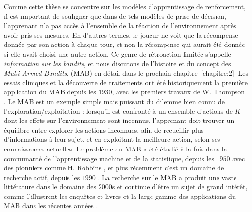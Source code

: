 \begin{resume_fr}
Comme cette thèse se concentre sur les modèles d'apprentissage de renforcement,
il est important de souligner que dans de tels modèles de prise de décision, l'apprenant n'a pas accès à l'ensemble de la réaction de l'environnement après avoir pris ses mesures.
%
En d'autres termes, le joueur ne voit que la récompense donnée par son action à chaque tour, et non la récompense qui aurait été donnée si elle avait choisi une autre action.
Ce genre de rétroaction limitée s'appelle \emph{information sur les bandits}, et nous discutons de l'histoire et du concept des \emph{Multi-Armed Bandits}. (MAB) en détail dans le prochain chapitre~\ref{chapitre:2}.
Les essais cliniques et la découverte de traitements ont été historiquement la première application du MAB depuis les $1930$, avec les premiers travaux de W. Thompson \cite{Thompson33}.
%
Le MAB est un exemple simple mais puissant du dilemme bien connu de l'exploration/exploitation :
lorsqu'il est confronté à un ensemble d'actions de $K$ dont les effets sur l'environnement sont inconnus, l'apprenant doit trouver un équilibre entre
explorer les actions inconnues, afin de recueillir plus d'informations à leur sujet,
et en exploitant la meilleure action, selon ses connaissances actuelles.
%
Le problème du MAB a été étudié à la fois dans la communauté de l'apprentissage machine et de la statistique, depuis les $1950$ avec des pionniers comme H. Robbins \cite{Robbins52}, et plus récemment c'est un domaine de recherche actif, depuis les $1990$ \cite{Anantharam87a,Anantharam87b,auer1995gambling,Agrawal95}.
La recherche sur le MAB a produit une vaste littérature dans le domaine des $2000$s \cite{Auer02,Auer02NonStochastic,Audibert2009minimax} et continue d'être un sujet de grand intérêt, comme l'illustrent les enquêtes et livres \cite{Bubeck12,LattimoreBanditAlgorithmsBook,Slivkins2019} et la large gamme des applications du MAB dans les récentes années \cite{bouneffouf2019survey}.


\end{resume_fr}
